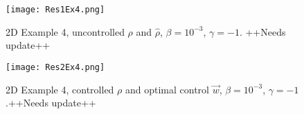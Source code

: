 \begin{figure}[h]
	\texttt{[image: Res1Ex4.png]}
	\caption{2D Example 4, uncontrolled $\rho$ and $\widehat \rho$, $\beta = 10^{-3}$, $\gamma = -1$. ++Needs update++}
	\label{rhoHat2dEx4}
\end{figure}
\begin{figure}[h]
	\texttt{[image: Res2Ex4.png]}
	\caption{2D Example 4, controlled $\rho$ and optimal control $\vec{w}$, $\beta = 10^{-3}$, $\gamma = -1$.++Needs update++}
	\label{rhoOpt2dEx4}
\end{figure}









